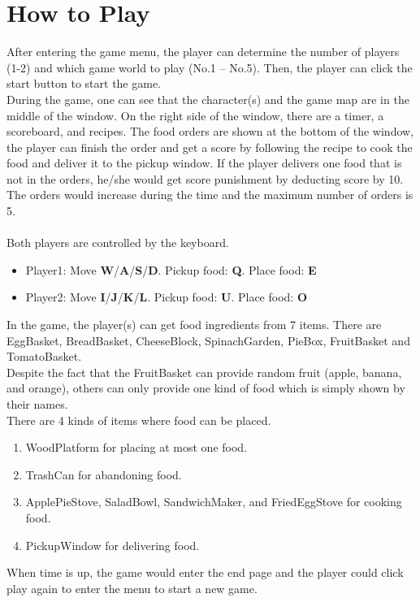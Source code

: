 \section{How to Play}
After entering the game menu, the player can determine the number of players (1-2) and which game world to play (No.1 – No.5). Then, the player can click the start button to start the game.\\
During the game, one can see that the character(s) and the game map are in the middle of the window. On the right side of the window, there are a timer, a scoreboard, and recipes. The food orders are shown at the bottom of the window, the player can finish the order and get a score by following the recipe to cook the food and deliver it to the pickup window. If the player delivers one food that is not in the orders, he/she would get score punishment by deducting score by 10. The orders would increase during the time and the maximum number of orders is 5.\\
\\
Both players are controlled by the keyboard.\\
\begin{itemize}
    \item Player1: Move \textbf{W}/\textbf{A}/\textbf{S}/\textbf{D}. Pickup food: \textbf{Q}. Place food: \textbf{E}\\
    \item Player2: Move \textbf{I}/\textbf{J}/\textbf{K}/\textbf{L}. Pickup food: \textbf{U}. Place food: \textbf{O}\\
\end{itemize}


In the game, the player(s) can get food ingredients from 7 items. There are EggBasket, BreadBasket, CheeseBlock, SpinachGarden, PieBox, FruitBasket and TomatoBasket.\\
Despite the fact that the FruitBasket can provide random fruit (apple, banana, and orange), others can only provide one kind of food which is simply shown by their names.\\
There are 4 kinds of items where food can be placed.\\
\begin{enumerate}
	\item WoodPlatform for placing at most one food.
    \item TrashCan for abandoning food.
    \item ApplePieStove, SaladBowl, SandwichMaker, and FriedEggStove for cooking food.
    \item PickupWindow for delivering food.
\end{enumerate}
When time is up, the game would enter the end page and the player could click play again to enter the menu to start a new game.
